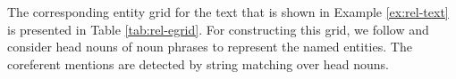 



%

The corresponding entity grid for the text that is shown in Example \ref{ex:rel-text} is presented in Table \ref{tab:rel-egrid}. 
For constructing this grid, we follow  and consider head nouns of noun phrases to represent the named entities.  
The coreferent mentions are detected by string matching over head nouns. 

